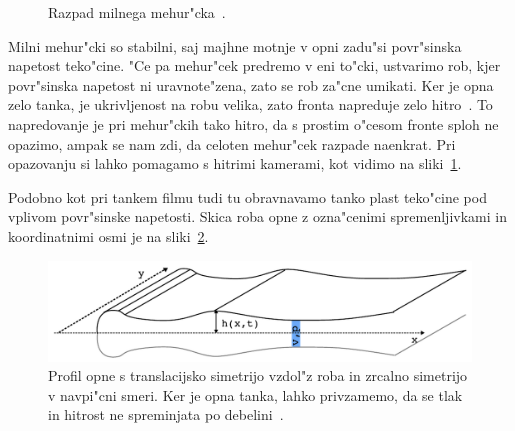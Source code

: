 \documentclass[a4paper,12pt]{article}
\begin{document}
\begin{figure}[h]
 \centering
{}
\caption{Razpad milnega mehur"cka~\cite{slike-mehurcek}. }
\label{fig:mehurcek-3}
\end{figure}

Milni mehur"cki so stabilni, saj majhne motnje v opni zadu"si povr"sinska napetost teko"cine. "Ce pa mehur"cek predremo v eni to"cki, ustvarimo rob, kjer povr"sinska napetost ni uravnote"zena, zato se rob za"cne umikati. Ker je opna zelo tanka, je ukrivljenost na robu velika, zato fronta napreduje zelo hitro~\cite{diploma}. To napredovanje je pri mehur"ckih tako hitro, da s prostim o"cesom fronte sploh ne opazimo, ampak se nam zdi, da celoten mehur"cek razpade naenkrat. Pri opazovanju si lahko pomagamo s hitrimi kamerami, kot vidimo na sliki~\ref{fig:mehurcek-3}. 

Podobno kot pri tankem filmu tudi tu obravnavamo tanko plast teko"cine pod vplivom povr"sinske napetosti. Skica roba opne z ozna"cenimi spremenljivkami in koordinatnimi osmi je na sliki~\ref{fig:mehurcek-skica}. 
\begin{figure}[h]
 \centering
\includegraphics[width=.8\textwidth]{./Slike/mehurcek-skica}
\caption{Profil opne s translacijsko simetrijo vzdol"z roba in zrcalno simetrijo v navpi"cni smeri. Ker je opna tanka, lahko privzamemo, da se tlak in hitrost ne spreminjata po debelini~\cite{diploma}. }
\label{fig:mehurcek-skica}
\end{figure}
\end{document}

